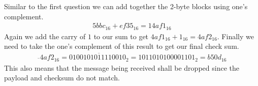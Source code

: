 \documentclass{article}
\begin{document}
Similar to the first question we can add together the 2-byte blocks using one's complement.
\begin{align*}
    5bbc_{16} + ef35_{16} = 14af1_{16}
\end{align*}
Again we add the carry of $1$ to our sum to get $4af1_{16} + 1_{16} = 4af2_{16}$. Finally we need to take the one's complement of this result to get our final check sum.
\begin{align*}
    \overline{}{4af2_{16}} = \overline{0100101011110010_{2}} = 1011010100001101_{2} = b50d_{16}
\end{align*}
This also means that the message being received shall be dropped since the payload and checksum do not match.
\end{document}
